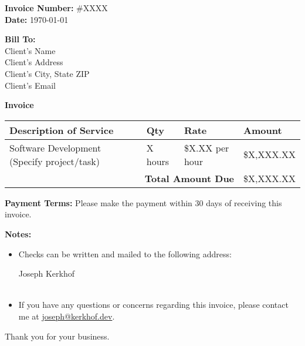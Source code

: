 \documentclass[a4paper, 11pt]{article}
\begin{document}
\begin{flushright}
    \textbf{Invoice Number:} \#XXXX \\
    \textbf{Date:} \today
\end{flushright}

\begin{flushleft}
\textbf{Bill To:} \\
Client's Name \\
Client's Address \\
Client's City, State ZIP \\
Client's Email
\end{flushleft}

\vspace{2em}

\begin{center}
\textbf{\Large Invoice}
\end{center}

\begin{tabular}{|p{}|p{}|p{}|p{}|}
    \hline
    \textbf{Description of Service} & \textbf{Qty} & \textbf{Rate} & \textbf{Amount} \\
    \hline
    Software Development (Specify project/task) & X hours & \$X.XX per hour & \$X,XXX.XX \\
    \hline
    \multicolumn{3}{|r|}{\textbf{Total Amount Due}} & \$X,XXX.XX \\
    \hline
\end{tabular}

\vspace{2em}

\textbf{Payment Terms:} Please make the payment within 30 days of receiving this invoice.

\vspace{2em}

\textbf{Notes:}
\begin{itemize}
    \item Checks can be written and mailed to the following address:

    Joseph Kerkhof \\
    [Address] \\
    [City, ST ZIP]

    \item If you have any questions or concerns regarding this invoice, please contact me at \href{mailto:joseph@kerkhof.dev}{joseph@kerkhof.dev}.
\end{itemize}

\vspace{2em}

Thank you for your business.
\end{document}
